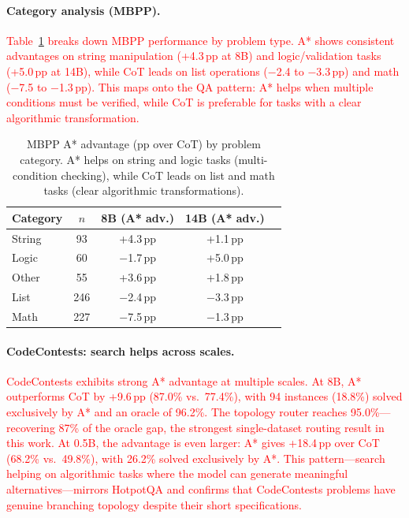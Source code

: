 \documentclass[11pt]{article}
\begin{document}
{{\paragraph{Category analysis (MBPP).}
\textcolor{red}{Table~\ref{tab:code_categories} breaks down MBPP performance by problem type. A* shows consistent advantages on string manipulation (+4.3\,pp at 8B) and logic/validation tasks (+5.0\,pp at 14B), while CoT leads on list operations ($-$2.4 to $-$3.3\,pp) and math ($-$7.5 to $-$1.3\,pp). This maps onto the QA pattern: A* helps when multiple conditions must be verified, while CoT is preferable for tasks with a clear algorithmic transformation.}

\begin{table}[ht]
\centering
\small
\begin{tabular}{lcccc}
\toprule
\textbf{Category} & \textbf{$n$} & \textbf{8B (A* adv.)} & \textbf{14B (A* adv.)} \\
\midrule
String      & 93  & +4.3\,pp & +1.1\,pp \\
Logic       & 60  & $-$1.7\,pp & +5.0\,pp \\
Other       & 55  & +3.6\,pp & +1.8\,pp \\
List        & 246 & $-$2.4\,pp & $-$3.3\,pp \\
Math        & 227 & $-$7.5\,pp & $-$1.3\,pp \\
\bottomrule
\end{tabular}
\caption{MBPP A* advantage (pp over CoT) by problem category. A* helps on string and logic tasks (multi-condition checking), while CoT leads on list and math tasks (clear algorithmic transformations).}
\label{tab:code_categories}
\end{table}

\paragraph{CodeContests: search helps across scales.}
\textcolor{red}{CodeContests exhibits strong A* advantage at multiple scales. At 8B, A* outperforms CoT by +9.6\,pp (87.0\% vs.\ 77.4\%), with 94 instances (18.8\%) solved exclusively by A* and an oracle of 96.2\%. The topology router reaches 95.0\%---recovering 87\% of the oracle gap, the strongest single-dataset routing result in this work. At 0.5B, the advantage is even larger: A* gives +18.4\,pp over CoT (68.2\% vs.\ 49.8\%), with 26.2\% solved exclusively by A*. This pattern---search helping on algorithmic tasks where the model can generate meaningful alternatives---mirrors HotpotQA and confirms that CodeContests problems have genuine branching topology despite their short specifications.}

}}
\end{document}
